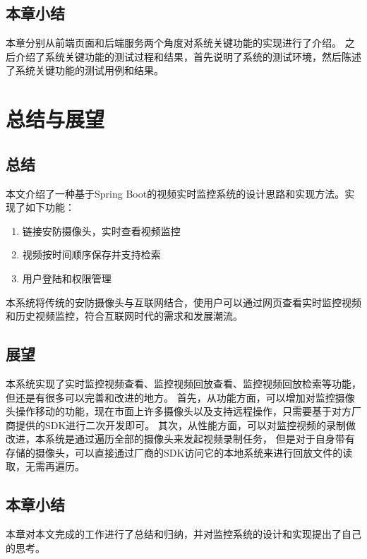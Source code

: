 \section{本章小结}
本章分别从前端页面和后端服务两个角度对系统关键功能的实现进行了介绍。
之后介绍了系统关键功能的测试过程和结果，首先说明了系统的测试环境，然后陈述了系统关键功能的测试用例和结果。


\chapter{总结与展望}
\section{总结}
本文介绍了一种基于Spring Boot的视频实时监控系统的设计思路和实现方法。实现了如下功能：
\begin{enumerate}
    \item 链接安防摄像头，实时查看视频监控
    \item 视频按时间顺序保存并支持检索
    \item 用户登陆和权限管理
\end{enumerate}

本系统将传统的安防摄像头与互联网结合，使用户可以通过网页查看实时监控视频和历史视频监控，符合互联网时代的需求和发展潮流。

\section{展望}
本系统实现了实时监控视频查看、监控视频回放查看、监控视频回放检索等功能，但还是有很多可以完善和改进的地方。
首先，从功能方面，可以增加对监控摄像头操作移动的功能，现在市面上许多摄像头以及支持远程操作，只需要基于对方厂商提供的SDK进行二次开发即可。
其次，从性能方面，可以对监控视频的录制做改进，本系统是通过遍历全部的摄像头来发起视频录制任务，
但是对于自身带有存储的摄像头，可以直接通过厂商的SDK访问它的本地系统来进行回放文件的读取，无需再遍历。

\section{本章小结}
本章对本文完成的工作进行了总结和归纳，并对监控系统的设计和实现提出了自己的思考。